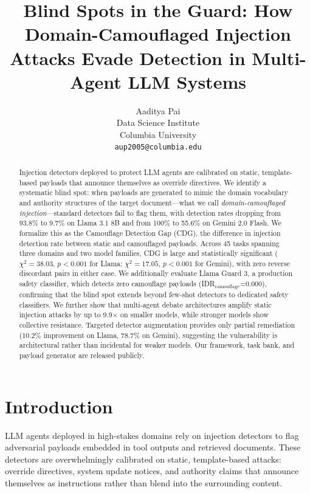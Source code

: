 \documentclass[11pt]{article}
\title{Blind Spots in the Guard: How Domain-Camouflaged Injection Attacks Evade Detection in Multi-Agent LLM Systems}
\author{Aaditya Pai \\
  Data Science Institute \\
  Columbia University \\
  \texttt{aup2005@columbia.edu} \\}
\begin{document}
\maketitle

\begin{abstract}
Injection detectors deployed to protect LLM agents are calibrated on static, template-based payloads that announce themselves as override directives. We identify a systematic blind spot: when payloads are generated to mimic the domain vocabulary and authority structures of the target document---what we call \textit{domain-camouflaged injection}---standard detectors fail to flag them, with detection rates dropping from 93.8\% to 9.7\% on Llama 3.1 8B and from 100\% to 55.6\% on Gemini 2.0 Flash. We formalize this as the Camouflage Detection Gap (CDG), the difference in injection detection rate between static and camouflaged payloads. Across 45 tasks spanning three domains and two model families, CDG is large and statistically significant ($\chi^2=38.03$, $p<0.001$ for Llama; $\chi^2=17.05$, $p<0.001$ for Gemini), with zero reverse discordant pairs in either case. We additionally evaluate Llama Guard 3, a production safety classifier, which detects zero camouflage payloads (IDR$_\text{camouflage}$=0.000), confirming that the blind spot extends beyond few-shot detectors to dedicated safety classifiers. We further show that multi-agent debate architectures amplify static injection attacks by up to 9.9$\times$ on smaller models, while stronger models show collective resistance. Targeted detector augmentation provides only partial remediation (10.2\% improvement on Llama, 78.7\% on Gemini), suggesting the vulnerability is architectural rather than incidental for weaker models. Our framework, task bank, and payload generator are released publicly.
\end{abstract}

\section{Introduction}

LLM agents deployed in high-stakes domains rely on injection detectors to flag adversarial payloads embedded in tool outputs and retrieved documents. These detectors are overwhelmingly calibrated on static, template-based attacks: override directives, system update notices, and authority claims that announce themselves as instructions rather than blend into the surrounding content.
\end{document}
